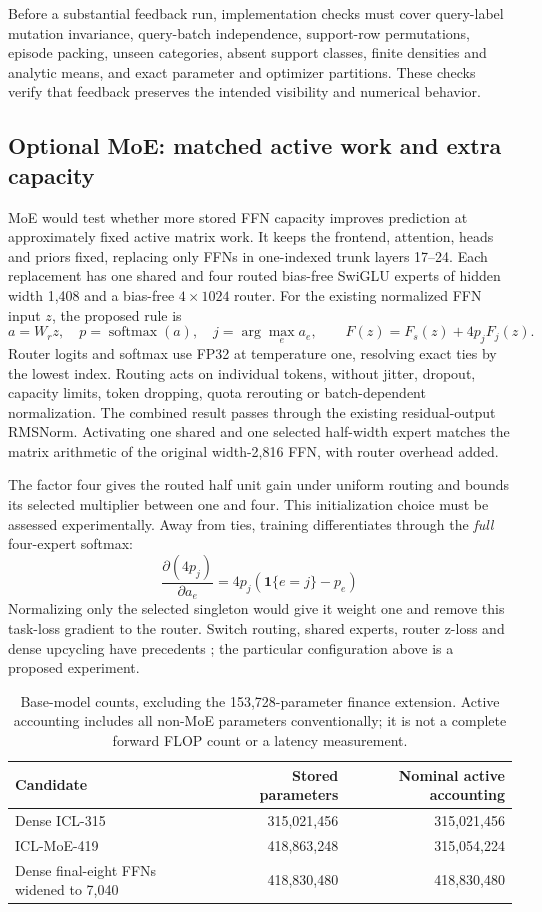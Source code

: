 \documentclass[11pt]{article}
\newcommand{\ind}{\mathbf{1}}
\begin{document}
Before a substantial feedback run, implementation checks must cover query-label mutation invariance, query-batch independence, support-row permutations, episode packing, unseen categories, absent support classes, finite densities and analytic means, and exact parameter and optimizer partitions. These checks verify that feedback preserves the intended visibility and numerical behavior.

\subsection{Optional MoE: matched active work and extra capacity}

MoE would test whether more stored FFN capacity improves prediction at approximately fixed active matrix work. It keeps the frontend, attention, heads and priors fixed, replacing only FFNs in one-indexed trunk layers 17--24. Each replacement has one shared and four routed bias-free SwiGLU experts of hidden width 1,408 and a bias-free $4\times1024$ router. For the existing normalized FFN input $z$, the proposed rule is
\[
a=W_rz,\quad p=\operatorname{softmax}(a),\quad j=\arg\max_e a_e,
\qquad F(z)=F_s(z)+4p_jF_j(z).
\]
Router logits and softmax use FP32 at temperature one, resolving exact ties by the lowest index. Routing acts on individual tokens, without jitter, dropout, capacity limits, token dropping, quota rerouting or batch-dependent normalization. The combined result passes through the existing residual-output RMSNorm. Activating one shared and one selected half-width expert matches the matrix arithmetic of the original width-2,816 FFN, with router overhead added.

The factor four gives the routed half unit gain under uniform routing and bounds its selected multiplier between one and four. This initialization choice must be assessed experimentally. Away from ties, training differentiates through the \emph{full} four-expert softmax:
\[
\frac{\partial(4p_j)}{\partial a_e}=4p_j(\ind\{e=j\}-p_e)
\]
Normalizing only the selected singleton would give it weight one and remove this task-loss gradient to the router. Switch routing, shared experts, router z-loss and dense upcycling have precedents \cite{switch,stmoe,sparseupcycling}; the particular configuration above is a proposed experiment.

\begin{table}[ht]
\centering\small
\begin{tabularx}{\linewidth}{@{}Yrr@{}}
\toprule Candidate & Stored parameters & Nominal active accounting\\
\midrule
Dense ICL-315 & 315,021,456 & 315,021,456\\
ICL-MoE-419 & 418,863,248 & 315,054,224\\
Dense final-eight FFNs widened to 7,040 & 418,830,480 & 418,830,480\\
\bottomrule
\end{tabularx}
\caption{Base-model counts, excluding the 153,728-parameter finance extension. Active accounting includes all non-MoE parameters conventionally; it is not a complete forward FLOP count or a latency measurement.}
\end{table}
\end{document}

